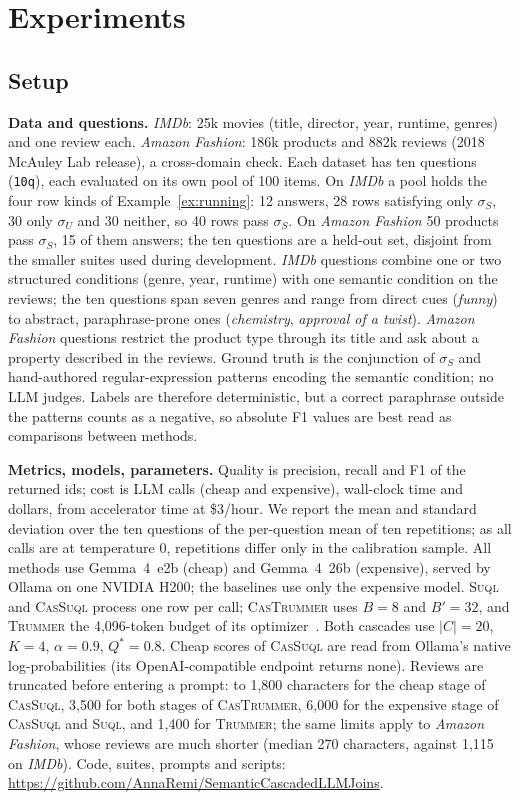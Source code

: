 \documentclass[sigconf]{acmart}
\begin{document}
\section{Experiments}
\label{sec:eval}

\subsection{Setup}
\label{sec:setup}
\textbf{Data and questions.} \textit{IMDb}: 25k movies (title, director, year, runtime, genres) and one review each. \textit{Amazon Fashion}: 186k products and 882k reviews (2018 McAuley Lab release), a cross-domain check. Each dataset has ten questions (\texttt{10q}), each evaluated on its own pool of 100 items. On \textit{IMDb} a pool holds the four row kinds of Example~\ref{ex:running}: 12 answers, 28 rows satisfying only $\sigma_S$, 30 only $\sigma_U$ and 30 neither, so 40 rows pass $\sigma_S$. On \textit{Amazon Fashion} 50 products pass $\sigma_S$, 15 of them answers; the ten questions are a held-out set, disjoint from the smaller suites used during development. \textit{IMDb} questions combine one or two structured conditions (genre, year, runtime) with one semantic condition on the reviews; the ten questions span seven genres and range from direct cues (\emph{funny}) to abstract, paraphrase-prone ones (\emph{chemistry}, \emph{approval of a twist}). \textit{Amazon Fashion} questions restrict the product type through its title and ask about a property described in the reviews. Ground truth is the conjunction of $\sigma_S$ and hand-authored regular-expression patterns encoding the semantic condition; no LLM judges. Labels are therefore deterministic, but a correct paraphrase outside the patterns counts as a negative, so absolute F1 values are best read as comparisons between methods.

\textbf{Metrics, models, parameters.} Quality is precision, recall and F1 of the returned ids; cost is LLM calls (cheap and expensive), wall-clock time and dollars, from accelerator time at \$3/hour. We report the mean and standard deviation over the ten questions of the per-question mean of ten repetitions; as all calls are at temperature 0, repetitions differ only in the calibration sample. All methods use Gemma~4~e2b (cheap) and Gemma~4~26b (expensive), served by Ollama on one NVIDIA H200; the baselines use only the expensive model. \textsc{Suql} and \textsc{CasSuql} process one row per call; \textsc{CasTrummer} uses $B{=}8$ and $B'{=}32$, and \textsc{Trummer} the 4,096-token budget of its optimizer~\cite{trummer2025semanticjoin}. Both cascades use $|C|{=}20$, $K{=}4$, $\alpha{=}0.9$, $Q^\ast{=}0.8$. Cheap scores of \textsc{CasSuql} are read from Ollama's native log-probabilities (its OpenAI-compatible endpoint returns none). Reviews are truncated before entering a prompt: to 1,800 characters for the cheap stage of \textsc{CasSuql}, 3,500 for both stages of \textsc{CasTrummer}, 6,000 for the expensive stage of \textsc{CasSuql} and \textsc{Suql}, and 1,400 for \textsc{Trummer}; the same limits apply to \textit{Amazon Fashion}, whose reviews are much shorter (median 270 characters, against 1,115 on \textit{IMDb}). Code, suites, prompts and scripts: \url{https://github.com/AnnaRemi/SemanticCascadedLLMJoins}.
\end{document}
